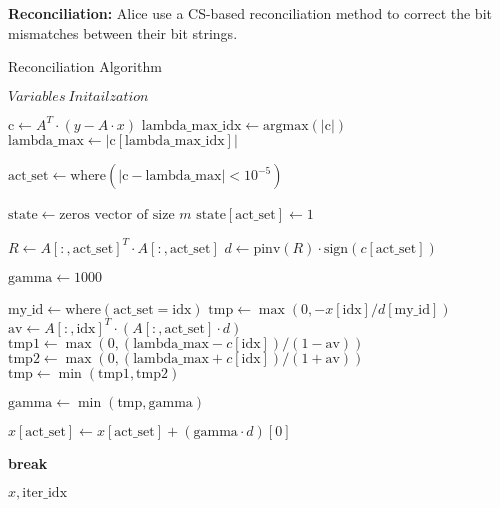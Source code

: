 \textbf{Reconciliation:} Alice use a CS-based reconciliation method to correct the bit mismatches between their bit strings.
\begin{algorithm}[hbt!]
  \caption{Reconciliation Algorithm}\label{alg:Reconciliation}
  \begin{algorithmic}
      \State $Variables\ Initailzation$
  
          \State $\text{c} \gets A^T \cdot (y - A \cdot x)$
          \State $\text{lambda\_max\_idx} \gets \text{argmax}(|\text{c}|)$
          \State $\text{lambda\_max} \gets |\text{c}[\text{lambda\_max\_idx}]|$
  
          \State $\text{act\_set} \gets \text{where}(|\text{c} - \text{lambda\_max}| < 10^{-5})$
  
          \State $\text{state} \gets \text{zeros vector of size } m$
          \State $\text{state}[\text{act\_set}] \gets 1$
  
          \State $R \gets A[:, \text{act\_set}]^T \cdot A[:, \text{act\_set}]$
          \State $d \gets \text{pinv}(R) \cdot \text{sign}(c[\text{act\_set}])$
  
          \State $\text{gamma} \gets 1000$
  
                  \State $\text{my\_id} \gets \text{where}(\text{act\_set} = \text{idx})$
                  \State $\text{tmp} \gets \max(0, -x[\text{idx}] / d[\text{my\_id}])$
              \Else
                  \State $\text{av} \gets A[:, \text{idx}]^T \cdot (A[:, \text{act\_set}] \cdot d)$
                  \State $\text{tmp1} \gets \max(0, (\text{lambda\_max} - c[\text{idx}]) / (1 - \text{av}))$
                  \State $\text{tmp2} \gets \max(0, (\text{lambda\_max} + c[\text{idx}]) / (1 + \text{av}))$
                  \State $\text{tmp} \gets \min(\text{tmp1}, \text{tmp2})$
              \EndIf
  
                  \State $\text{gamma} \gets \min(\text{tmp}, \text{gamma})$
              \EndIf
          \EndFor
  
          \State $x[\text{act\_set}] \gets x[\text{act\_set}] + (\text{gamma} \cdot d)[0]$
  
              \State \textbf{break}
          \EndIf
      \EndFor
  
      \State \Return $x, \text{iter\_idx}$
  \EndFunction
  \end{algorithmic}
  \end{algorithm}
